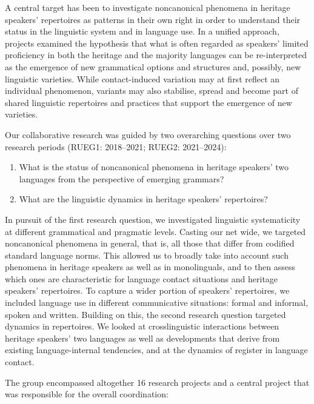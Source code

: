 \documentclass[output=paper,colorlinks,citecolor=brown]{langscibook}
\begin{document}
A central target has been to investigate noncanonical phenomena in heritage speakers’ repertoires as patterns in their own right in order to understand their status in the linguistic system and in language use. In a unified approach, projects examined the hypothesis that what is often regarded as speakers’ limited proficiency in both the heritage and the majority languages can be re-interpreted as the emergence of new grammatical options and structures and, possibly, new linguistic varieties. While contact-induced variation may at first reflect an individual phenomenon, variants may also stabilise, spread and become part of shared linguistic repertoires and practices that support the emergence of new varieties.

Our collaborative research was guided by two overarching questions over two research periods (RUEG1: 2018--2021; RUEG2: 2021--2024):

\begin{enumerate}
    \item What is the status of noncanonical phenomena in heritage speakers’ two languages from the perspective of emerging grammars?
    \item What are the linguistic dynamics in heritage speakers’ repertoires?
\end{enumerate}

In pursuit of the first research question, we investigated linguistic systematicity at different grammatical and pragmatic levels. Casting our net wide, we targeted noncanonical phenomena in general, that is, all those that differ from codified standard language norms. This allowed us to broadly take into account such phenomena in heritage speakers as well as in monolinguals, and to then assess which ones are characteristic for language contact situations and heritage speakers’ repertoires. To capture a wider portion of speakers’ repertoires, we included language use in different communicative situations: formal and informal, spoken and written. Building on this, the second research question targeted dynamics in repertoires. We looked at crosslinguistic interactions between heritage speakers’ two languages as well as developments that derive from existing language-internal tendencies, and at the dynamics of register in language contact.

The group encompassed altogether 16 research projects and a central project that was responsible for the overall coordination:
\end{document}
